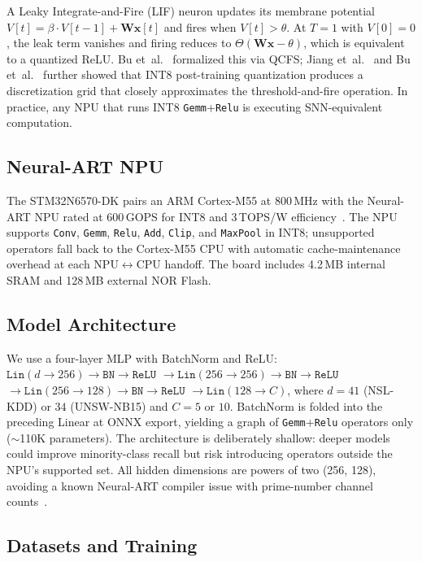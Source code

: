 \documentclass[conference]{IEEEtran}
\begin{document}
A Leaky Integrate-and-Fire (LIF) neuron updates its membrane potential
$V[t] = \beta \cdot V[t{-}1] + \mathbf{W}\mathbf{x}[t]$ and fires
when $V[t] > \theta$.
At $T{=}1$ with $V[0]{=}0$, the leak term vanishes and firing reduces
to $\Theta(\mathbf{W}\mathbf{x} - \theta)$, which is equivalent to a
quantized ReLU.
Bu et~al.~\cite{bu2022optimal} formalized this via QCFS;
Jiang et~al.~\cite{jiang2023unified} and
Bu et~al.~\cite{bu2025inference} further showed that INT8
post-training quantization produces a discretization grid that closely
approximates the threshold-and-fire operation.
In practice, any NPU that runs INT8 \texttt{Gemm}+\texttt{Relu}
is executing SNN-equivalent computation.

\subsection{Neural-ART NPU}

The STM32N6570-DK pairs an ARM Cortex-M55 at 800\,MHz with the
Neural-ART NPU rated at 600\,GOPS for INT8 and 3\,TOPS/W
efficiency~\cite{st_neural_art}.
The NPU supports \texttt{Conv}, \texttt{Gemm}, \texttt{Relu},
\texttt{Add}, \texttt{Clip}, and \texttt{MaxPool} in INT8;
unsupported operators fall back to the Cortex-M55 CPU with
automatic cache-maintenance overhead at each NPU$\leftrightarrow$CPU
handoff.
The board includes 4.2\,MB internal SRAM and
128\,MB external NOR Flash.

\subsection{Model Architecture}

We use a four-layer MLP with BatchNorm and ReLU:
$\texttt{Lin}(d{\to}256) \to \texttt{BN} \to \texttt{ReLU}$
$\to \texttt{Lin}(256{\to}256) \to \texttt{BN} \to \texttt{ReLU}$
$\to \texttt{Lin}(256{\to}128) \to \texttt{BN} \to \texttt{ReLU}$
$\to \texttt{Lin}(128{\to}C)$,
where $d{=}41$ (NSL-KDD) or $34$ (UNSW-NB15) and $C{=}5$ or $10$.
BatchNorm is folded into the preceding Linear at ONNX export, yielding
a graph of \texttt{Gemm}+\texttt{Relu} operators only (${\sim}$110K parameters).
The architecture is deliberately shallow: deeper models could improve
minority-class recall but risk introducing operators outside the NPU's
supported set.
All hidden dimensions are powers of two (256, 128), avoiding a known
Neural-ART compiler issue with prime-number channel
counts~\cite{st_neural_art}.

\subsection{Datasets and Training}
\end{document}
